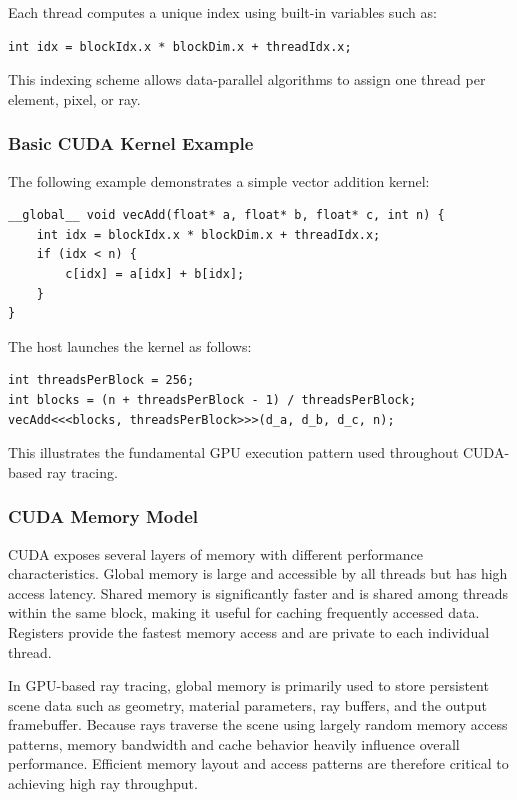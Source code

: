 \documentclass[11pt]{article}
\begin{document}
Each thread computes a unique index using built-in variables such as:
\begin{verbatim}
int idx = blockIdx.x * blockDim.x + threadIdx.x;
\end{verbatim}

This indexing scheme allows data-parallel algorithms to assign one thread per element, pixel, or ray.

\subsubsection{Basic CUDA Kernel Example}

The following example demonstrates a simple vector addition kernel:

\begin{verbatim}
__global__ void vecAdd(float* a, float* b, float* c, int n) {
    int idx = blockIdx.x * blockDim.x + threadIdx.x;
    if (idx < n) {
        c[idx] = a[idx] + b[idx];
    }
}
\end{verbatim}

The host launches the kernel as follows:

\begin{verbatim}
int threadsPerBlock = 256;
int blocks = (n + threadsPerBlock - 1) / threadsPerBlock;
vecAdd<<<blocks, threadsPerBlock>>>(d_a, d_b, d_c, n);
\end{verbatim}

This illustrates the fundamental GPU execution pattern used throughout CUDA-based ray tracing.

\subsubsection{CUDA Memory Model}

CUDA exposes several layers of memory with different performance characteristics. Global memory is large and accessible by all threads but has high access latency. Shared memory is significantly faster and is shared among threads within the same block, making it useful for caching frequently accessed data. Registers provide the fastest memory access and are private to each individual thread. 

In GPU-based ray tracing, global memory is primarily used to store persistent scene data such as geometry, material parameters, ray buffers, and the output framebuffer. Because rays traverse the scene using largely random memory access patterns, memory bandwidth and cache behavior heavily influence overall performance. Efficient memory layout and access patterns are therefore critical to achieving high ray throughput.
\end{document}
